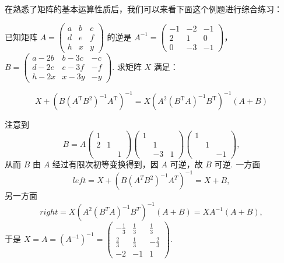 在熟悉了矩阵的基本运算性质后，我们可以来看下面这个例题进行综合练习：
\begin{example}
    已知矩阵 $A=\begin{pmatrix}a & b & c \\ d & e & f \\ h & x & y\end{pmatrix}$ 的逆是 $A^{-1}=\begin{pmatrix}-1 & -2 & -1 \\ 2 & 1 & 0 \\ 0 & -3 & -1\end{pmatrix}$，\\
    $B=\begin{pmatrix}a-2b & b-3c & -c \\ d-2e & e-3f & -f \\ h-2x & x-3y & -y\end{pmatrix}$. 求矩阵 $X$ 满足：

    \[X+\left(B(A^\mathrm{T}B^2)^{-1}A^\mathrm{T}\right)^{-1}=X\left(A^2(B^\mathrm{T}A)^{-1}B^\mathrm{T}\right)^{-1}(A+B)\]
\end{example}

\begin{solution}
    注意到
    \[B=A\left(\begin{array}{ccc}
        1 & & \\ 2 & 1 & \\ & & 1
    \end{array}\right)\left(\begin{array}{ccc}
        1 & & \\ & 1 & \\ & -3 & 1
    \end{array}\right)\left(\begin{array}{ccc}
        1 & & \\ & 1 & \\ & & -1
    \end{array}\right),\]
    从而 $B$ 由 $A$ 经过有限次初等变换得到，因 $A$ 可逆，故 $B$ 可逆. 一方面
    \[left=X+\left(B\left(A^{T} B^{2}\right)^{-1} A^{T}\right)^{-1}=X+B,\]
    另一方面
    \[right=X\left(A^{2}\left(B^{T} A\right)^{-1} B^{T}\right)^{-1}(A+B)=X A^{-1}(A+B),\]
    于是 $X=A=(A^{-1})^{-1}=\begin{pmatrix}
    -\frac{1}{3} & \frac{1}{3} & \frac{1}{3}\\
    \frac{2}{3} & \frac{1}{3} & -\frac{2}{3} \\
    -2 & -1 & 1
    \end{pmatrix}$.
\end{solution}


